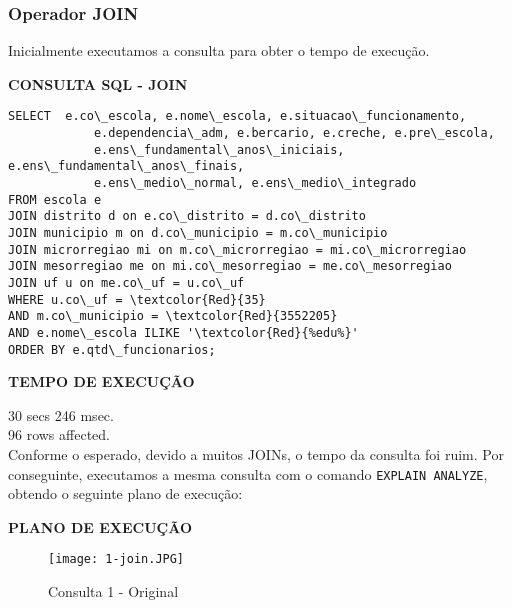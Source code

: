 \documentclass[12pt,a4paper]{article}
\begin{document}
\subsubsection{Operador JOIN}

Inicialmente executamos a consulta para obter o tempo de execução.

\vspace{0.5cm}

\begin{flushleft}
\textbf{CONSULTA SQL - JOIN}\\
\end{flushleft}

\begin{Verbatim}[commandchars=\\\{\}]
SELECT  e.co\_escola, e.nome\_escola, e.situacao\_funcionamento,
            e.dependencia\_adm, e.bercario, e.creche, e.pre\_escola,
            e.ens\_fundamental\_anos\_iniciais, e.ens\_fundamental\_anos\_finais,
            e.ens\_medio\_normal, e.ens\_medio\_integrado
FROM escola e
JOIN distrito d on e.co\_distrito = d.co\_distrito
JOIN municipio m on d.co\_municipio = m.co\_municipio
JOIN microrregiao mi on m.co\_microrregiao = mi.co\_microrregiao
JOIN mesorregiao me on mi.co\_mesorregiao = me.co\_mesorregiao
JOIN uf u on me.co\_uf = u.co\_uf
WHERE u.co\_uf = \textcolor{Red}{35}
AND m.co\_municipio = \textcolor{Red}{3552205}
AND e.nome\_escola ILIKE '\textcolor{Red}{%edu%}'
ORDER BY e.qtd\_funcionarios;
\end{Verbatim}

\begin{flushleft}
\textbf{TEMPO DE EXECUÇÃO}\\
\end{flushleft}
30 secs 246 msec.\\
96 rows affected.\\

Conforme o esperado, devido a muitos JOINs, o tempo da consulta foi ruim. Por conseguinte, executamos a mesma consulta com o comando \texttt{EXPLAIN ANALYZE}, obtendo o seguinte plano de execução:


\begin{flushleft}
\textbf{PLANO DE EXECUÇÃO}\\
\end{flushleft}

\begin{figure}[H]
    \centering
    \texttt{[image: 1-join.JPG]}
    \caption{Consulta 1 - Original}
    \label{fig:diagrama}
\end{figure}
\end{document}
